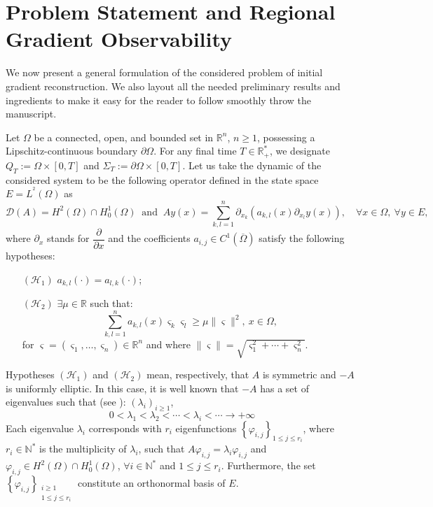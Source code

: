 \documentclass{article}
\begin{document}
\section{Problem Statement and Regional Gradient Observability}
\label{sec:2}

We now present a general formulation of the considered problem of initial 
gradient reconstruction. We also layout all the needed preliminary results 
and ingredients to make it easy for the reader to follow smoothly throw the manuscript. 

Let $\Omega$ be a connected, open, and bounded set in $\mathbb{R}^n$, $n\geq 1$, 
possessing a Lipschitz-continuous boundary $\partial\Omega$. For any final time 
$T\in\mathbb{R}^*_+$, we designate $Q_T := \Omega\times[0,T]$ and 
$\Sigma_T := \partial\Omega\times[0,T]$. Let us take the dynamic of the 
considered system to be the following operator 
defined in the state space $E=L^{^2}(\Omega)$ as
\begin{equation}
\label{A}
\mathcal{D}(A) = H^2(\Omega)\cap H^1_0(\Omega) 
\ \mbox{ and }  \ 
Ay(x) = \displaystyle\sum_{k,l=1}^{n} 
\partial_{x_k}\left(a_{k,l}(x)\partial_{x_l}y(x)\right), 
\quad \forall x\in\Omega, \ \forall y\in E,
\end{equation}
where $\partial_{x}$ stands for $\dfrac{\partial}{\partial x}$
and the coefficients $a_{i,j} \in C^1(\overline{\Omega})$ 
satisfy the following hypotheses:
\begin{enumerate}

\item[$(\mathcal{H}_1)$] $a_{k,l}(\cdot) = a_{l,k}(\cdot)$;

\item[$(\mathcal{H}_2)$] $\exists \mu\in\mathbb{R}$ such that: 
$$
\displaystyle\sum_{k,l=1}^{n} a_{k,l}(x)\varsigma_k\varsigma_l
\geq \mu \|\varsigma\|^2, \ x\in\Omega,
$$ 
for $\varsigma=(\varsigma_1,\ldots,\varsigma_n)\in\mathbb{R}^n$ 
and where $\|\varsigma\|=\sqrt{\varsigma_1^2 + \cdots + \varsigma_n^2}$. 
\end{enumerate}

Hypotheses $(\mathcal{H}_1)$ and $(\mathcal{H}_2)$ mean, respectively, 
that $A$ is symmetric and $-A$ is uniformly elliptic. In this case, 
it is well known that $-A$ has a set of eigenvalues such that (see \cite{Yam}):
$\left(\lambda_i\right)_{i\geq 1}$, 
$$
0<\lambda_1<\lambda_2
< \cdots < \lambda_i
<\cdots \rightarrow +\infty
$$  
Each eigenvalue $\lambda_i$ 
corresponds with $r_i$ eigenfunctions 
$\left\{\varphi_{i,j}\right\}_{1\leq j \leq r_i}$, 
where $r_i\in\mathbb{N}^*$ is the multiplicity 
of $\lambda_i$, such that $A\varphi_{i,j} = \lambda_i\varphi_{i,j}$ 
and $\varphi_{i,j} \in H^2(\Omega)\cap H^1_0(\Omega)$, 
$\forall i\in\mathbb{N}^*$ and $1\leq j\leq r_i$. Furthermore, the set 
$\left\{\varphi_{i,j}\right\}_{\substack{ i\geq 1 \\ 1\leq j\leq r_i}}$ 
constitute an orthonormal basis of $E$.
\end{document}
